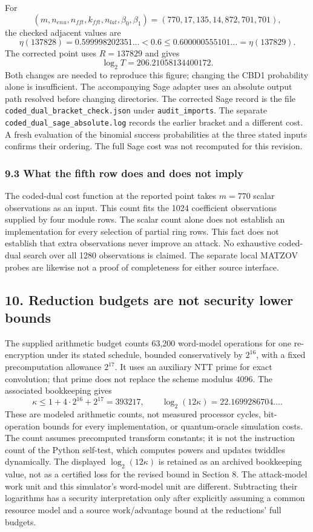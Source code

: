 \documentclass[
  10pt,
  a4paper,
]{article}
\begin{document}
For \[
(m,n_{enu},n_{fft},k_{fft},n_{lat},\beta_0,\beta_1)
=(770,17,135,14,872,701,701),
\] the checked adjacent values are \[
\eta(137828)=0.599998202351\ldots<0.6
\le0.600000555101\ldots=\eta(137829).
\] The corrected point uses \(R=137829\) and gives \[
\log_2T=206.21058134400172.
\] Both changes are needed to reproduce this figure; changing the CBD1
probability alone is insufficient. The accompanying Sage adapter uses an
absolute output path resolved before changing directories. The corrected
Sage record is the file \texttt{coded\_dual\_bracket\_check.json} under
\texttt{audit\_imports}. The separate
\texttt{coded\_dual\_sage\_absolute.log} records the earlier bracket and
a different cost. A fresh evaluation of the binomial success
probabilities at the three stated inputs confirms their ordering. The
full Sage cost was not recomputed for this revision.

\subsubsection{9.3 What the fifth row does and does not
imply}\label{what-the-fifth-row-does-and-does-not-imply}

The coded-dual cost function at the reported point takes \(m=770\)
scalar observations as an input. This count fits the 1024 coefficient
observations supplied by four module rows. The scalar count alone does
not establish an implementation for every selection of partial ring
rows. This fact does not establish that extra observations never improve
an attack. No exhaustive coded-dual search over all 1280 observations is
claimed. The separate local MATZOV probes are likewise not a proof of
completeness for either source interface.

\subsection{10. Reduction budgets are not security lower
bounds}\label{reduction-budgets-are-not-security-lower-bounds}

The supplied arithmetic budget counts 63,200 word-model operations for
one re-encryption under its stated schedule, bounded conservatively by
\(2^{16}\), with a fixed precomputation allowance \(2^{17}\). It uses an
auxiliary NTT prime for exact convolution; that prime does not replace
the scheme modulus 4096. The associated bookkeeping gives \[
\kappa\le1+4\cdot2^{16}+2^{17}=393217,\qquad
\log_2(12\kappa)=22.1699286704\ldots.
\] These are modeled arithmetic counts, not measured processor cycles,
bit-operation bounds for every implementation, or quantum-oracle
simulation costs. The count assumes precomputed transform constants; it
is not the instruction count of the Python self-test, which computes
powers and updates twiddles dynamically. The displayed
\(\log_2(12\kappa)\) is retained as an archived bookkeeping value, not
as a certified loss for the revised bound in Section 8. The attack-model
work unit and this simulator's word-model unit are different.
Subtracting their logarithms has a security interpretation only after
explicitly assuming a common resource model and a source work/advantage
bound at the reductions' full budgets.
\end{document}
